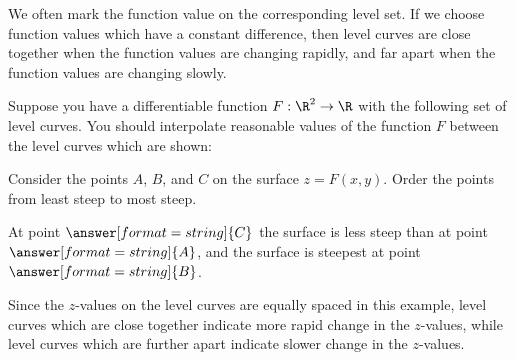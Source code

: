 \documentclass{ximera}
\begin{document}
We often mark the function value on the corresponding level set. 
If we choose function values which have a constant difference, then level
curves are close together when the function values are changing rapidly, and
far apart when the function values are changing slowly.

\begin{question}
  Suppose you have a differentiable function $F:\R^2\to\R$ with the following set of
  level curves.  You should interpolate reasonable values of the function $F$  
  between the level curves which are shown:
  \begin{image}
  \end{image}
  Consider the points $A$, $B$, and $C$ on the surface
  $z=F(x,y)$. Order the points from least steep to most steep.


  \begin{prompt}
    At point $\answer[format=string]{C}$ the surface is less steep
    than at point $\answer[format=string]{A}$, and the surface is
    steepest at point $\answer[format=string]{B}$.
    \begin{feedback}
    Since the $z$-values on the level curves are equally spaced in this 
    example, level curves which are close together indicate more rapid 
    change in the $z$-values, while level curves which are further apart 
    indicate slower change in the $z$-values.
    \end{feedback}
  \end{prompt}
\end{question}
\end{document}
